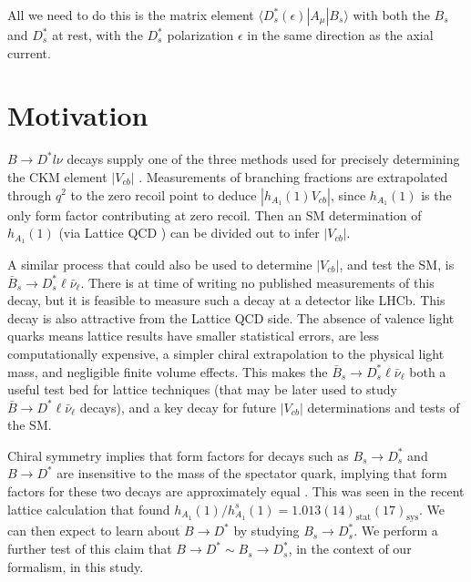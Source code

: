All we need to do this is the matrix element $\langle D^*_s(\epsilon)| A_{\mu} | B_s \rangle$ with both the $B_s$ and $D_s^*$ at rest, with the $D_s^*$ polarization $\epsilon$ in the same direction as the axial current.

\section{Motivation}
\label{sec:BsDsstar_intro}

$B\to D^{*} l \nu$ decays supply one of the three methods used for precisely determining the CKM element $|V_{cb}|$ \cite{Schroder:1994aj,PhysRevLett.64.2117,PhysRevD.43.651,ALBRECHT1992195,Barish:1994mu,BUSKULIC1996449,Buskulic:1994dz,Abbiendi:2000hk,Abreu:2001ic,Adam:2002uw,Abdallah:2004rz,Aubert:2007rs,Aubert:2007qs,Aubert:2008yv,Dungel:2010uk,Abdesselam:2017kjf,Bailey:2014tva,Abdesselam:2018nnh}.
Measurements of branching fractions are extrapolated through $q^2$ to the zero recoil point to deduce $|h_{A_1}(1)V_{cb}|$, since $h_{A_1}(1)$ is the only form factor contributing at zero recoil. Then an SM determination of $h_{A_1}(1)$ (via Lattice QCD \cite{Bailey:2014tva,Harrison:2017fmw}) can be divided out to infer $|V_{cb}|$.

A similar process that could also be used to determine $|V_{cb}|$, and test the SM, is $\bar{B}_s \to D^*_s \ell\bar{\nu}_{\ell}$. There is at time of writing no published measurements of this decay, but it is feasible to measure such a decay at a detector like LHCb. This decay is also attractive from the Lattice QCD side.
The absence of valence light quarks means lattice results have smaller statistical errors, are less computationally expensive, a simpler chiral extrapolation to the physical light mass, and negligible finite volume effects. This makes the $\bar{B}_s \to D^*_s \ell\bar{\nu}_{\ell}$ both a useful test bed for lattice techniques (that may be later used to study $\bar{B} \to D^* \ell \bar{\nu}_{\ell}$ decays), and a key decay for future $|V_{cb}|$ determinations and tests of the SM.

Chiral symmetry implies that form factors for decays such as $B_s \to D^*_s$ and $B \to D^*$ are insensitive to the mass of the spectator quark, implying that form factors for these two decays are approximately equal \cite{Laiho:2005ue}. This was seen in the recent lattice calculation \cite{Harrison:2017fmw} that found $h_{A_1}(1) / h^s_{A_1}(1) = 1.013(14)_{\text{stat}}(17)_{\text{sys}}$. We can then expect to learn about $B\to D^*$ by studying $B_s\to D_s^*$. We perform a further test of this claim that $B\to D^*\sim B_s\to D_s^*$, in the context of our formalism, in this study.

